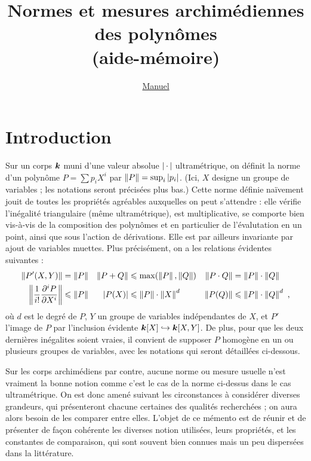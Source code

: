 \documentclass[11pt, twoside, a4paper]{article}
\author{\href{http://math.jussieu.fr/~mpg/}{Manuel \bsc{Pégourié-Gonnard}}}
\title{Normes et mesures archimédiennes des polynômes \\ (aide-mémoire)}
\begin{document}
\maketitle

	\section*{Introduction}

Sur un corps $\boldsymbol{k}$ muni d'une valeur absolue $\left\lvert{\,\cdot\,}\right\rvert$ ultramétrique, on définit la norme d'un polynôme $P = \sum p_i X^i$ par $\left\lVert P\right\rVert = \sup_i \left\lvert p_i\right\rvert$. (Ici, $X$ designe un groupe de variables ; les notations seront précisées plus bas.) Cette norme définie naïvement jouit de toutes les propriétés agréables auxquelles on peut s'attendre : elle vérifie l'inégalité triangulaire (même ultramétrique), est multiplicative, se comporte bien vis-à-vis de la composition des polynômes et en particulier de l'évalutation en un point, ainsi que sous l'action de dérivations. Elle est par ailleurs invariante par ajout de variables muettes. Plus précisément, on a les relations évidentes suivantes :
\begin{align*}
 \left\lVert P'(X, Y)\right\rVert &= \left\lVert P\right\rVert 	
  & \left\lVert P+Q\right\rVert &\leqslant \max(\left\lVert P\right\rVert, \left\lVert Q\right\rVert)	
  & \left\lVert P\cdot Q\right\rVert &= \left\lVert P\right\rVert \cdot \left\lVert Q\right\rVert  \\
 \left\lVert\frac{1}{i!}\frac{\partial^i P}{\partial X^i}\right\rVert &\leqslant \left\lVert P\right\rVert 
  & \left\lvert P(X)\right\rvert &\leqslant \left\lVert P\right\rVert \cdot \left\lVert X\right\rVert^d 	
  & \left\lVert P(Q)\right\rVert &\leqslant \left\lVert P\right\rVert \cdot \left\lVert Q\right\rVert^d  \text{ ,}
\end{align*}
où $d$ est le degré de $P$, $Y$ un groupe de variables indépendantes de $X$, et $P'$ l'image de $P$ par l'inclusion évidente $\boldsymbol{k}[X] \hookrightarrow \boldsymbol{k}[X, Y]$. De plus, pour que les deux dernières inégalites soient vraies, il convient de supposer $P$ homogène en un ou plusieurs groupes de variables, avec les notations qui seront détaillées ci-dessous.

Sur les corps archimédiens par contre, aucune norme ou mesure usuelle n'est vraiment \og la\fg{} bonne notion comme c'est le cas de la norme ci-dessus dans le cas ultramétrique. On est donc amené suivant les circonstances à considérer diverses grandeurs, qui présenteront chacune certaines des qualités recherchées ; on aura alors besoin de les comparer entre elles. L'objet de ce mémento est de réunir et de présenter de façon cohérente les diverses notion utilisées, leurs propriétés, et les constantes de comparaison, qui sont souvent bien connues mais un peu dispersées dans la littérature.
\end{document}
